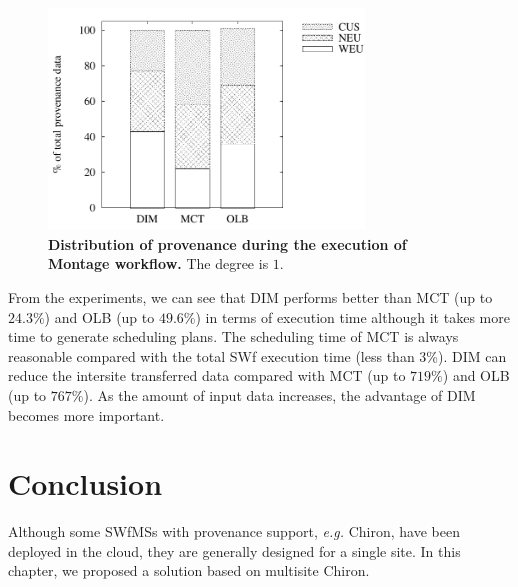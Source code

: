 \begin{figure}
\begin{centering}
\captionsetup{justification=centering}
\includegraphics[width=84mm]{figures/provMontage}
\par\end{centering}
\caption{\textbf{Distribution of provenance during the execution of Montage workflow.} The degree is $1$.}
\label{fig:provMontage}
\end{figure}

From the experiments, we can see that DIM performs better than MCT (up to $24.3\%$) and OLB (up to $49.6\%$) in terms of execution time although it takes more time to generate scheduling plans. The scheduling time of MCT is always reasonable compared with the total SWf execution time (less than $3$\%). DIM can reduce the intersite transferred data compared with MCT (up to $719\%$) and OLB (up to $767\%$). As the amount of input data increases, the advantage of DIM becomes more important. 

\section{Conclusion}
\label{sec:FGCon}

Although some SWfMSs with provenance support, \textit{e.g.} Chiron, have been deployed in the cloud, they are generally designed for a single site. In this chapter, we proposed a solution based on multisite Chiron.

